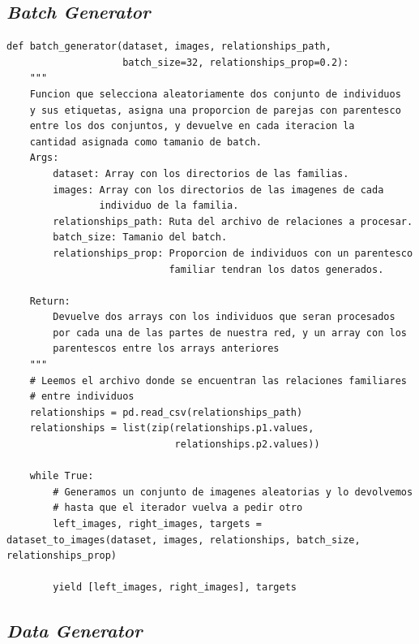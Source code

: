 \documentclass[11pt,a4paper]{article}
\begin{document}
\subsection{\textit{Batch Generator}}


\begin{lstlisting}
def batch_generator(dataset, images, relationships_path,
                    batch_size=32, relationships_prop=0.2):
    """
    Funcion que selecciona aleatoriamente dos conjunto de individuos
    y sus etiquetas, asigna una proporcion de parejas con parentesco
    entre los dos conjuntos, y devuelve en cada iteracion la
    cantidad asignada como tamanio de batch.
    Args:
        dataset: Array con los directorios de las familias.
        images: Array con los directorios de las imagenes de cada
                individuo de la familia.
        relationships_path: Ruta del archivo de relaciones a procesar.
        batch_size: Tamanio del batch.
        relationships_prop: Proporcion de individuos con un parentesco
                            familiar tendran los datos generados.
    
    Return:
        Devuelve dos arrays con los individuos que seran procesados
        por cada una de las partes de nuestra red, y un array con los
        parentescos entre los arrays anteriores
    """
    # Leemos el archivo donde se encuentran las relaciones familiares
    # entre individuos
    relationships = pd.read_csv(relationships_path)
    relationships = list(zip(relationships.p1.values,
                             relationships.p2.values))
    
    while True:
        # Generamos un conjunto de imagenes aleatorias y lo devolvemos
        # hasta que el iterador vuelva a pedir otro
        left_images, right_images, targets = dataset_to_images(dataset, images, relationships, batch_size, relationships_prop)

        yield [left_images, right_images], targets
\end{lstlisting}



\subsection{\textit{Data Generator}}
\end{document}
